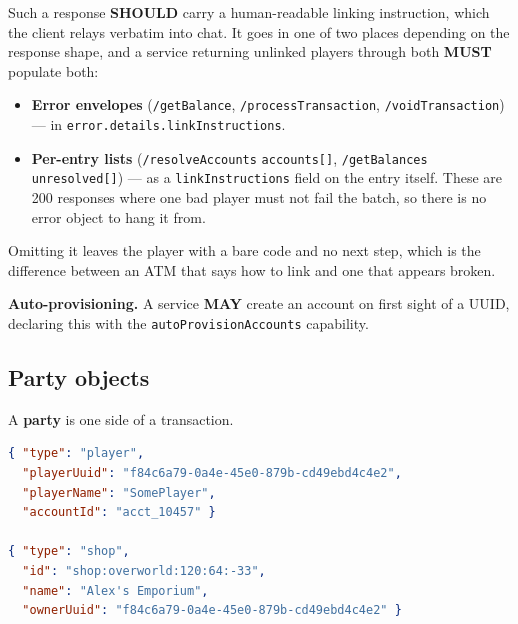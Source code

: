 \documentclass[11pt,a4paper]{article}
\newcommand{\code}[1]{\texttt{\small #1}}
\newcommand{\req}{\textbf{MUST}}
\newcommand{\rec}{\textbf{SHOULD}}
\newcommand{\opt}{\textbf{MAY}}
\begin{document}
Such a response \rec{} carry a human-readable linking instruction, which the client relays
verbatim into chat. It goes in one of two places depending on the response shape, and a service
returning unlinked players through both \req{} populate both:

\begin{itemize}
  \item \textbf{Error envelopes} (\code{/getBalance}, \code{/processTransaction},
        \code{/voidTransaction}) --- in \code{error.details.linkInstructions}.
  \item \textbf{Per-entry lists} (\code{/resolveAccounts} \code{accounts[]},
        \code{/getBalances} \code{unresolved[]}) --- as a \code{linkInstructions} field on the
        entry itself. These are 200 responses where one bad player must not fail the batch, so
        there is no error object to hang it from.
\end{itemize}

Omitting it leaves the player with a bare code and no next step, which is the difference between
an ATM that says how to link and one that appears broken.

\textbf{Auto-provisioning.} A service \opt{} create an account on first sight of a UUID, declaring
this with the \code{autoProvisionAccounts} capability.

\subsection{Party objects}
\label{sec:parties}

A \textbf{party} is one side of a transaction.

\begin{lstlisting}[language=json]
{ "type": "player",
  "playerUuid": "f84c6a79-0a4e-45e0-879b-cd49ebd4c4e2",
  "playerName": "SomePlayer",
  "accountId": "acct_10457" }

{ "type": "shop",
  "id": "shop:overworld:120:64:-33",
  "name": "Alex's Emporium",
  "ownerUuid": "f84c6a79-0a4e-45e0-879b-cd49ebd4c4e2" }
\end{lstlisting}
\end{document}
